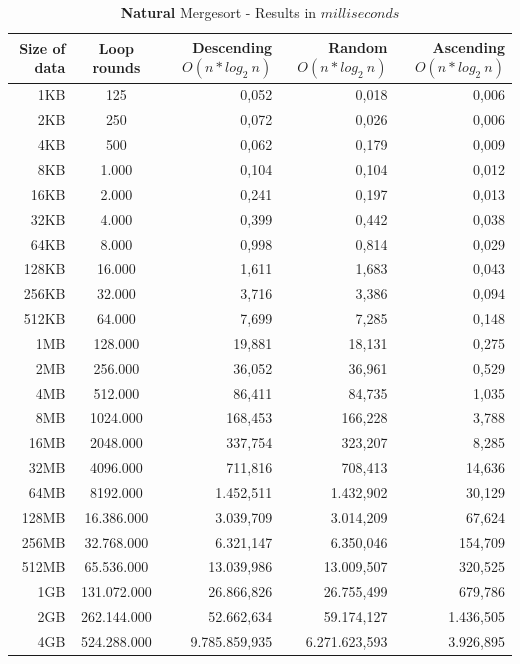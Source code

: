 \documentclass[11pt]{amsart}
\begin{document}
\begin{table}[htdp]
	\caption{\textbf{Natural} Mergesort - Results in $milliseconds$}
	\begin{tabular}{|r|c|r|r|r|} \hline
		Size of data & Loop rounds & \parbox[c]{3.5cm}{Descending \\ $O(n*log_2~n)$} & \parbox[c]{3.5cm}{Random \\$O(n*log_2~n)$} & \parbox[c]{3.5cm}{Ascending \\ $O(n*log_2~n)$} \\ \hline
		1KB & 125 & 0,052 & 0,018 & 0,006 \\ \hline
		2KB & 250 & 0,072 & 0,026 & 0,006 \\ \hline
		4KB & 500 & 0,062 & 0,179 & 0,009 \\ \hline
		8KB & 1.000 & 0,104 & 0,104 & 0,012 \\ \hline
		16KB & 2.000 & 0,241 & 0,197 & 0,013 \\ \hline
		32KB & 4.000 & 0,399 & 0,442 & 0,038 \\ \hline
		64KB & 8.000 & 0,998 & 0,814 & 0,029 \\ \hline
		128KB & 16.000 & 1,611 & 1,683 & 0,043 \\ \hline
		256KB & 32.000 & 3,716 & 3,386 & 0,094 \\ \hline
		512KB & 64.000 & 7,699 & 7,285 & 0,148 \\ \hline
		1MB & 128.000 & 19,881 & 18,131 & 0,275 \\ \hline
		2MB & 256.000 & 36,052 & 36,961 & 0,529 \\ \hline
		4MB & 512.000 & 86,411 & 84,735 & 1,035 \\ \hline
		8MB & 1024.000 & 168,453 & 166,228 & 3,788 \\ \hline
		16MB & 2048.000 & 337,754 & 323,207 & 8,285 \\ \hline
		32MB & 4096.000 & 711,816 & 708,413 & 14,636 \\ \hline
		64MB & 8192.000 & 1.452,511 & 1.432,902 & 30,129 \\ \hline
		128MB & 16.386.000 & 3.039,709 & 3.014,209 & 67,624 \\ \hline
		256MB & 32.768.000 & 6.321,147 & 6.350,046 & 154,709 \\ \hline
		512MB & 65.536.000 & 13.039,986 & 13.009,507 & 320,525 \\ \hline
		1GB & 131.072.000 & 26.866,826 & 26.755,499 & 679,786 \\ \hline
		2GB & 262.144.000 & 52.662,634 & 59.174,127 & 1.436,505 \\ \hline
		4GB & 524.288.000 & 9.785.859,935 & 6.271.623,593 & 3.926,895 \\ \hline
	\end{tabular}
	\label{default}
\end{table}%
\end{document}
